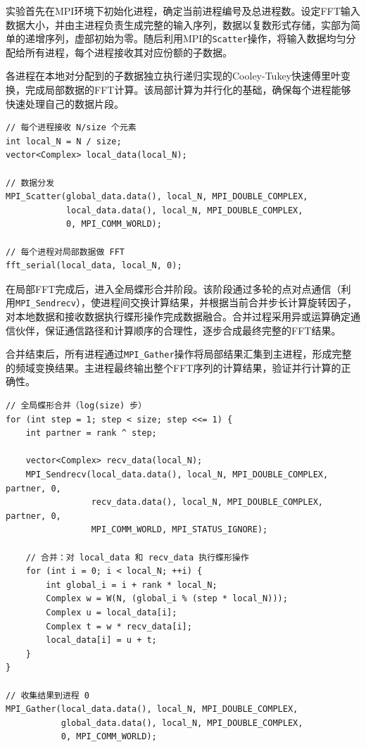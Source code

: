 \documentclass[a4paper, utf8]{ctexart}
\begin{document}
	实验首先在MPI环境下初始化进程，确定当前进程编号及总进程数。设定FFT输入数据大小，并由主进程负责生成完整的输入序列，数据以复数形式存储，实部为简单的递增序列，虚部初始为零。随后利用MPI的\verb|Scatter|操作，将输入数据均匀分配给所有进程，每个进程接收其对应份额的子数据。
	
	各进程在本地对分配到的子数据独立执行递归实现的Cooley-Tukey快速傅里叶变换，完成局部数据的FFT计算。该局部计算为并行化的基础，确保每个进程能够快速处理自己的数据片段。
	
	\begin{verbatim}
// 每个进程接收 N/size 个元素
int local_N = N / size;
vector<Complex> local_data(local_N);

// 数据分发
MPI_Scatter(global_data.data(), local_N, MPI_DOUBLE_COMPLEX,
            local_data.data(), local_N, MPI_DOUBLE_COMPLEX,
            0, MPI_COMM_WORLD);

// 每个进程对局部数据做 FFT
fft_serial(local_data, local_N, 0);
	\end{verbatim}
	
	在局部FFT完成后，进入全局蝶形合并阶段。该阶段通过多轮的点对点通信（利用\verb|MPI_Sendrecv|），使进程间交换计算结果，并根据当前合并步长计算旋转因子，对本地数据和接收数据执行蝶形操作完成数据融合。合并过程采用异或运算确定通信伙伴，保证通信路径和计算顺序的合理性，逐步合成最终完整的FFT结果。
	
	合并结束后，所有进程通过\verb|MPI_Gather|操作将局部结果汇集到主进程，形成完整的频域变换结果。主进程最终输出整个FFT序列的计算结果，验证并行计算的正确性。
	
	\begin{verbatim}
// 全局蝶形合并（log(size) 步）
for (int step = 1; step < size; step <<= 1) {
    int partner = rank ^ step;

    vector<Complex> recv_data(local_N);
    MPI_Sendrecv(local_data.data(), local_N, MPI_DOUBLE_COMPLEX, partner, 0,
                 recv_data.data(), local_N, MPI_DOUBLE_COMPLEX, partner, 0,
                 MPI_COMM_WORLD, MPI_STATUS_IGNORE);

    // 合并：对 local_data 和 recv_data 执行蝶形操作
    for (int i = 0; i < local_N; ++i) {
        int global_i = i + rank * local_N;
        Complex w = W(N, (global_i % (step * local_N)));
        Complex u = local_data[i];
        Complex t = w * recv_data[i];
        local_data[i] = u + t;
    }
}

// 收集结果到进程 0
MPI_Gather(local_data.data(), local_N, MPI_DOUBLE_COMPLEX,
           global_data.data(), local_N, MPI_DOUBLE_COMPLEX,
           0, MPI_COMM_WORLD);
	\end{verbatim}
	
\end{document}
